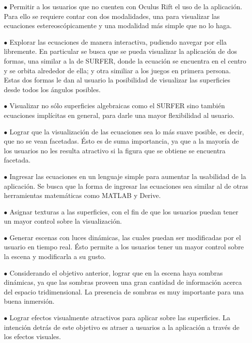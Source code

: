 \documentclass[12pt]{article}
\begin{document}
$\bullet$ Permitir a los usuarios que no cuenten con Oculus Rift el uso de la aplicación. Para ello se requiere contar con dos modalidades, una para visualizar las ecuaciones estereoscópicamente y una modalidad más simple que no lo haga.

$\bullet$ Explorar las ecuaciones de manera interactiva, pudiendo navegar por ella libremente. En particular se busca que se pueda visualizar la aplicación de dos formas, una similar a la de SURFER, donde la ecuación se encuentra en el centro y se orbita alrededor de ella; y otra similiar a los juegos en primera persona. Estas dos formas le dan al usuario la posibilidad de visualizar las superficies desde todos los ángulos posibles.

$\bullet$ Visualizar no sólo superficies algebraicas como el SURFER sino también ecuaciones implícitas en general, para darle una mayor flexibilidad al usuario.

$\bullet$ Lograr que la visualización de las ecuaciones sea lo más suave posible, es decir, que no se vean facetadas. Ésto es de suma importancia, ya que a la mayoría de los usuarios no les resulta atractivo si la figura que se obtiene se encuentra facetada.

$\bullet$ Ingresar las ecuaciones en un lenguaje simple para aumentar la usabilidad de la aplicación. Se busca que la forma de ingresar las ecuaciones sea similar al de otras herramientas matemáticas como MATLAB y Derive.

$\bullet$ Asignar texturas a las superficies, con el fin de que los usuarios puedan tener un mayor control sobre la visualización. 

$\bullet$ Generar escenas con luces dinámicas, las cuales puedan ser modificadas por el usuario en tiempo real. Ésto permite a los usuarios tener un mayor control sobre la escena y modificarla a su gusto.

$\bullet$ Considerando el objetivo anterior, lograr que en la escena haya sombras dinámicas, ya que las sombras proveen una gran cantidad de información acerca del espacio tridimensional. La presencia de sombras es muy importante para una buena inmersión.

$\bullet$ Lograr efectos visualmente atractivos para aplicar sobre las superficies. La intención detrás de este objetivo es atraer a usuarios a la aplicación a través de los efectos visuales.
\end{document}
